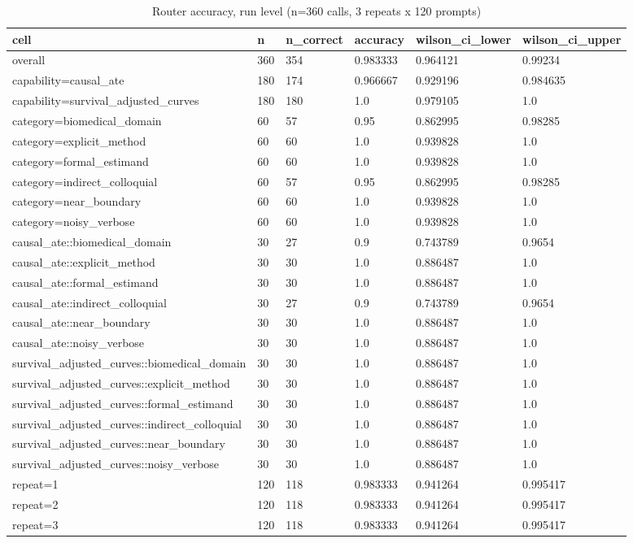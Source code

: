 \begin{table}[ht]
\centering
\caption{Router accuracy, run level (n=360 calls, 3 repeats x 120 prompts)}
\label{tab:router_accuracy_run_level}
\begin{tabular}{llllll}
\toprule
cell & n & n\_correct & accuracy & wilson\_ci\_lower & wilson\_ci\_upper \\
\midrule
overall & 360 & 354 & 0.983333 & 0.964121 & 0.99234 \\
capability=causal\_ate & 180 & 174 & 0.966667 & 0.929196 & 0.984635 \\
capability=survival\_adjusted\_curves & 180 & 180 & 1.0 & 0.979105 & 1.0 \\
category=biomedical\_domain & 60 & 57 & 0.95 & 0.862995 & 0.98285 \\
category=explicit\_method & 60 & 60 & 1.0 & 0.939828 & 1.0 \\
category=formal\_estimand & 60 & 60 & 1.0 & 0.939828 & 1.0 \\
category=indirect\_colloquial & 60 & 57 & 0.95 & 0.862995 & 0.98285 \\
category=near\_boundary & 60 & 60 & 1.0 & 0.939828 & 1.0 \\
category=noisy\_verbose & 60 & 60 & 1.0 & 0.939828 & 1.0 \\
causal\_ate::biomedical\_domain & 30 & 27 & 0.9 & 0.743789 & 0.9654 \\
causal\_ate::explicit\_method & 30 & 30 & 1.0 & 0.886487 & 1.0 \\
causal\_ate::formal\_estimand & 30 & 30 & 1.0 & 0.886487 & 1.0 \\
causal\_ate::indirect\_colloquial & 30 & 27 & 0.9 & 0.743789 & 0.9654 \\
causal\_ate::near\_boundary & 30 & 30 & 1.0 & 0.886487 & 1.0 \\
causal\_ate::noisy\_verbose & 30 & 30 & 1.0 & 0.886487 & 1.0 \\
survival\_adjusted\_curves::biomedical\_domain & 30 & 30 & 1.0 & 0.886487 & 1.0 \\
survival\_adjusted\_curves::explicit\_method & 30 & 30 & 1.0 & 0.886487 & 1.0 \\
survival\_adjusted\_curves::formal\_estimand & 30 & 30 & 1.0 & 0.886487 & 1.0 \\
survival\_adjusted\_curves::indirect\_colloquial & 30 & 30 & 1.0 & 0.886487 & 1.0 \\
survival\_adjusted\_curves::near\_boundary & 30 & 30 & 1.0 & 0.886487 & 1.0 \\
survival\_adjusted\_curves::noisy\_verbose & 30 & 30 & 1.0 & 0.886487 & 1.0 \\
repeat=1 & 120 & 118 & 0.983333 & 0.941264 & 0.995417 \\
repeat=2 & 120 & 118 & 0.983333 & 0.941264 & 0.995417 \\
repeat=3 & 120 & 118 & 0.983333 & 0.941264 & 0.995417 \\
\bottomrule
\end{tabular}
\end{table}
